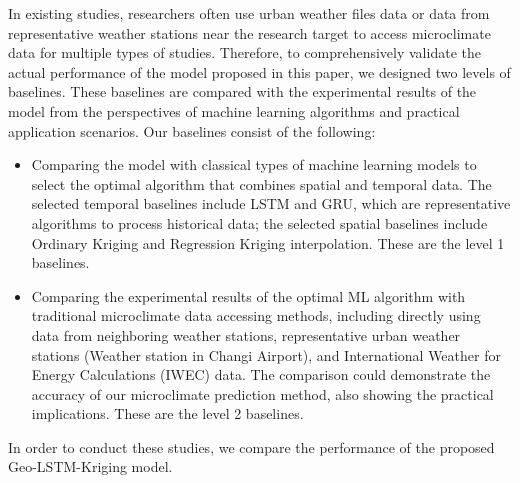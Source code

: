 \documentclass[a4paper,fleqn]{cas-sc}
\begin{document}
In existing studies, researchers often use urban weather files data or data from representative weather stations near the research target to access microclimate data for multiple types of studies. Therefore, to comprehensively validate the actual performance of the model proposed in this paper, we designed two levels of baselines. These baselines are compared with the experimental results of the model from the perspectives of machine learning algorithms and practical application scenarios. Our baselines consist of the following: 
\begin{itemize}
\item Comparing the model with classical types of machine learning models to select the optimal algorithm that combines spatial and temporal data. The selected temporal baselines include LSTM and GRU, which are representative algorithms to process historical data; the selected spatial baselines include Ordinary Kriging and Regression Kriging interpolation. These are the level 1 baselines.
\item Comparing the experimental results of the optimal ML algorithm with traditional microclimate data accessing methods, including directly using data from neighboring weather stations, representative urban weather stations (Weather station in Changi Airport), and International Weather for Energy Calculations (IWEC) data. The comparison could demonstrate the accuracy of our microclimate prediction method, also showing the practical implications. These are the level 2 baselines.

\end{itemize}

In order to conduct these studies, we compare the performance of the proposed Geo-LSTM-Kriging model.


\end{document}
